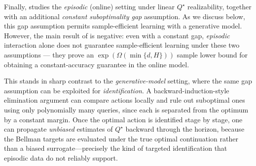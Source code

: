 Finally, \citet{Wang_linear_lower} studies the \emph{episodic} (online) setting
under linear $Q^\star$ realizability, together with an additional
\emph{constant suboptimality gap} assumption. As we discuss below, this gap
assumption permits sample-efficient learning with a generative model. However,
the main result of \citet{Wang_linear_lower} is negative: even with a constant
gap, \emph{episodic} interaction alone does not guarantee sample-efficient
learning under these two assumptions --- they prove an $\exp(\Omega(\min\{d,H\}))$ sample
lower bound for obtaining a constant-accuracy guarantee in the online model.

This stands in sharp contrast to the \emph{generative-model} setting, where the
same gap assumption can be exploited for \emph{identification}.  A
backward-induction-style elimination argument can compare actions locally and
rule out suboptimal ones using only polynomially many queries, since each is
separated from the optimum by a constant margin.  Once the optimal action is
identified stage by stage, one can propagate \emph{unbiased} estimates of
$Q^\star$ backward through the horizon, because the Bellman targets are evaluated
under the true optimal continuation rather than a biased surrogate—precisely the
kind of targeted identification that episodic data do not reliably support.
